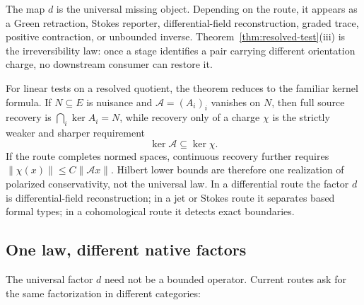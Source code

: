 \documentclass[11pt]{article}
\theoremstyle{definition}
\theoremstyle{remark}
\begin{document}
The map \(d\) is the universal missing object.  Depending on the route, it
appears as a Green retraction, Stokes reporter, differential-field
reconstruction, graded trace, positive contraction, or unbounded inverse.
Theorem~\ref{thm:resolved-test}(iii) is the irreversibility law: once a stage
identifies a pair carrying different orientation charge, no downstream
consumer can restore it.

For linear tests on a resolved quotient, the theorem reduces to the familiar
kernel formula.  If \(N\subseteq E\) is nuisance and
\(\mathcal A=(A_i)_i\) vanishes on \(N\), then full source recovery is
\(\bigcap_i\ker A_i=N\), while recovery only of a charge \(\chi\) is the
strictly weaker and sharper requirement
\[
                         \ker\mathcal A\subseteq\ker\chi.
\tag{2.0c}\label{eq:charge-kernel}
\]
If the route completes normed spaces, continuous recovery further requires
\(\|\chi(x)\|\le C\|\mathcal A x\|\).  Hilbert lower bounds are therefore
one realization of polarized conservativity, not the universal law.  In a
differential route the factor \(d\) is differential-field reconstruction;
in a jet or Stokes route it separates based formal types; in a cohomological
route it detects exact boundaries.

\subsection{One law, different native factors}

The universal factor \(d\) need not be a bounded operator.  Current routes
ask for the same factorization in different categories:
\end{document}
